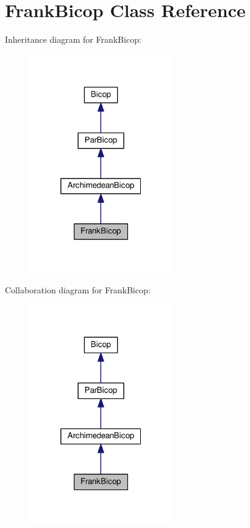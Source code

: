 \hypertarget{class_frank_bicop}{\section{Frank\+Bicop Class Reference}
\label{class_frank_bicop}
}


Inheritance diagram for Frank\+Bicop\+:\nopagebreak
\begin{figure}[H]
\begin{center}
\leavevmode
\includegraphics[width=176pt]{class_frank_bicop__inherit__graph}
\end{center}
\end{figure}


Collaboration diagram for Frank\+Bicop\+:\nopagebreak
\begin{figure}[H]
\begin{center}
\leavevmode
\includegraphics[width=176pt]{class_frank_bicop__coll__graph}
\end{center}
\end{figure}
